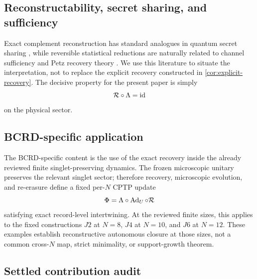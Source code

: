 \subsection{Reconstructability, secret sharing, and sufficiency}

Exact complement reconstruction has standard analogues in quantum secret sharing \cite{CleveGottesmanLo1999}, while reversible statistical reductions are naturally related to channel sufficiency and Petz recovery theory \cite{Petz1986}.  We use this literature to situate the interpretation, not to replace the explicit recovery constructed in \cref{cor:explicit-recovery}.  The decisive property for the present paper is simply
\begin{equation}
  \mathcal R\circ\Lambda=\operatorname{id}
\end{equation}
on the physical sector.

\subsection{BCRD-specific application}

The BCRD-specific content is the use of the exact recovery inside the already reviewed finite singlet-preserving dynamics.  The frozen microscopic unitary preserves the relevant singlet sector; therefore recovery, microscopic evolution, and re-erasure define a fixed per-$N$ CPTP update
\begin{equation}
  \Phi=\Lambda\circ\operatorname{Ad}_U\circ\mathcal R
\end{equation}
satisfying exact record-level intertwining.  At the reviewed finite sizes, this applies to the fixed constructions $J2$ at $N=8$, $J4$ at $N=10$, and $J6$ at $N=12$.  These examples establish reconstructive autonomous closure at those sizes, not a common cross-$N$ map, strict minimality, or support-growth theorem.

\subsection{Settled contribution audit}

